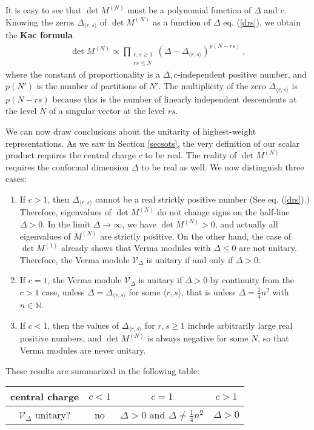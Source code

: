 \documentclass[12pt,a4paper,notitlepage]{report}
\newcommand \N {\mathbb{N}}
\numberwithin{equation}{section}
\theoremstyle{break}
\begin{document}
It is easy to see that $\det M^{(N)}$ must be a polynomial function of $\Delta$ and $c$. Knowing the zeros $\Delta_{\langle r,s \rangle}$ of $\det M^{(N)}$ as a function of $\Delta$ eq. (\ref{drs}), we obtain the \textbf{\boldmath Kac formula} 
\begin{align}
 \boxed{\det M^{(N)} \propto \prod_{\begin{smallmatrix} r,s\geq 1 \\ rs \leq N \end{smallmatrix}} (\Delta-\Delta_{\langle r,s \rangle})^{p(N-rs)}} \ ,
\end{align}
where the constant of proportionality is a $\Delta,c$-independent positive number, and $p(N')$ is the number of partitions of $N'$. The multiplicity of the zero $\Delta_{\langle r,s \rangle}$ is $p(N-rs)$ because this is the number of linearly independent descendents at the level $N$ of a singular vector at the level $rs$.  

We can now draw conclusions about the unitarity of highest-weight representations. As we saw in Section \ref{secsots}, the very definition of our scalar product requires the central charge $c$ to be real. The reality of $\det M^{(N)}$ requires the conformal dimension $\Delta$ to be real as well. We now distinguish three cases:
\begin{enumerate}
 \item 
If $c> 1$, then $\Delta_{\langle r,s \rangle}$ cannot be a real strictly positive number
 (See eq. (\ref{drs}).) Therefore, eigenvalues of $\det M^{(N)}$ do not change signs on the half-line $\Delta>0$. In the limit $\Delta\rightarrow \infty$, we have $\det M^{(N)}>0$, and actually all eigenvalues of $M^{(N)}$ are strictly positive. On the other hand, the case of $\det M^{(1)}$ already shows that Verma modules with $\Delta \leq 0$ are not unitary. Therefore, the Verma module $\mathcal{V}_\Delta$ is unitary if and only if $\Delta> 0$. 
\item 
If $c=1$, the Verma module $\mathcal{V}_\Delta$ is unitary if $\Delta > 0$ by continuity from the $c>1$ case, unless $\Delta=\Delta_{\langle r,s \rangle}$ for some $\langle r,s \rangle$, that is unless $\Delta =\frac14 n^2$ with $n\in \N$.
\item 
If $c<1$, then the values of $\Delta_{\langle r,s \rangle}$ for $r,s\geq 1$ include arbitrarily large real positive numbers, and $\det M^{(N)}$ is always negative for some $N$, so that Verma modules are never unitary.
\end{enumerate}
These results are summarized in the following table:
\begin{center}
 \begin{tabular}{|c|c|c|c|}
  \hline
central charge & $c<1$ & $c=1$ & $c>1$
\\
\hline
$\mathcal{V}_\Delta$ unitary? & no & $\Delta>0$ and $\Delta \neq \frac14 n^2$ & $\Delta>0$
\\
\hline
 \end{tabular}
\end{center}
\end{document}
